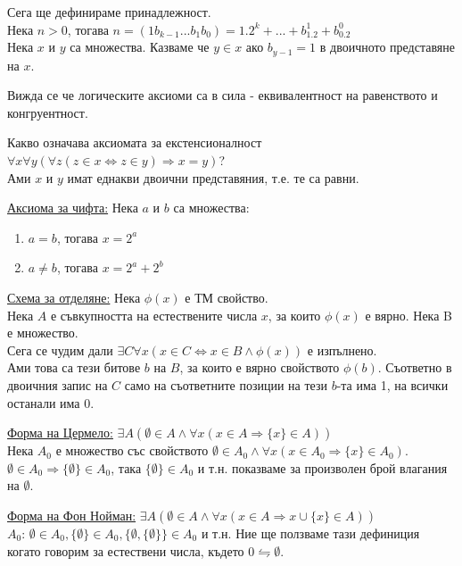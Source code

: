 \documentclass[fleqn, titlepage, 12pt]{report}
\begin{document}
Сега ще дефинираме принадлежност.\\
Нека $n>0$, тогава $n = (1 b_{k-1} ... b_1 b_0) = 1.2^k + ... + b_1.2^1 + b_0.2^0$\\
Нека $ x $ и $ y $ са множества. Казваме че $y \in x$ ако $b_{y-1} = 1$ в двоичното представяне на $ x $.
\bigbreak

Вижда се че логическите аксиоми са в сила - еквивалентност на равенството и конгруентност.
\bigbreak

Какво означава аксиомата за екстенсионалност
$ \forall{x} \forall{y} ( \forall{z} (z \in x \Leftrightarrow z \in y) \Rightarrow x = y)$?\\
Ами $ x $ и $ y $ имат еднакви двоични представяния, т.е. те са равни.
\bigbreak

\underline{Аксиома за чифта:} Нека $a$ и $b$ са множества:
\begin{enumerate}
  \item $a = b$, тогава $x = 2^a$
  \item $a \neq b$, тогава $x = 2^a + 2^b$
\end{enumerate}
\bigbreak

\underline{Схема за отделяне:} Нека $ \phi(x) $ е ТМ свойство.\\
Нека $ A $ е съвкупността на естествените числа $ x $,
за които $ \phi(x) $ е вярно. Нека B е множество.\\
Сега се чудим дали $ \exists{C} \forall{x} (x \in C \Leftrightarrow x \in B \land \phi(x) )$ е изпълнено.\\
Ами това са тези битове $b$ на $ B $, за които е вярно свойството $ \phi(b) $. Съответно в двоичния запис на $ C $ само на съответните позиции на тези $b$-та има 1, на всички останали има 0.
\bigbreak

\bigbreak
\underline{Форма на Цермело:} $ \exists{A} ( \emptyset \in A \land \forall{x} (x \in A \Rightarrow \{ x\} \in A))$\\
Нека $A_0$ е множество със свойството $ \emptyset \in  A_0 \land \forall{x} (x \in A_0 \Rightarrow \{ x\} \in A_0)$.
$ \emptyset \in A_0 \Rightarrow \{ \emptyset \} \in A_0$, така $ \{ \emptyset \} \in A_0$ и т.н. показваме за произволен брой влагания на $ \emptyset $.
\bigbreak

\underline{Форма на Фон Нойман:} $ \exists{A} ( \emptyset \in A \land \forall{x} (x \in A \Rightarrow x \cup \{ x\} \in A ))$\\
$A_0$: $ \emptyset \in  A_0, \{ \emptyset \} \in  A_0, \{ \emptyset , \{ \emptyset \}\} \in  A_0$ и т.н.
Ние ще ползваме тази дефиниция когато говорим за естествени числа, където $0 \leftrightharpoons \emptyset $.
\bigbreak
\end{document}
